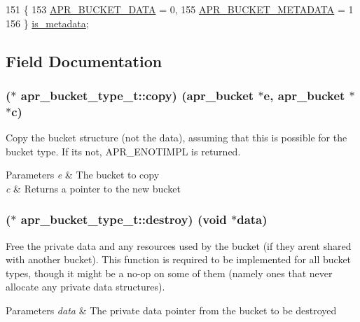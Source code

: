 \begin{DoxyCode}
151          \{
153         \hyperlink{structapr__bucket__type__t_a2c083ffe204e7b680e2de9edbf17a4b1a53d3ef9d6a275fe2b72a91acea7017d5}{APR\_BUCKET\_DATA} = 0,
155         \hyperlink{structapr__bucket__type__t_a2c083ffe204e7b680e2de9edbf17a4b1a9bf38b4eb3ea41c4af230432ac7a5fb1}{APR\_BUCKET\_METADATA} = 1
156     \} \hyperlink{structapr__bucket__type__t_a1a0d40943c081b8ea5f11810b66ae7b9}{is\_metadata};
\end{DoxyCode}


\subsection{Field Documentation}
\subsubsection[{\texorpdfstring{copy}{copy}}]{($\ast$ apr\+\_\+bucket\+\_\+type\+\_\+t\+::copy) ({\bf apr\+\_\+bucket} $\ast${\bf e}, {\bf apr\+\_\+bucket} $\ast$$\ast${\bf c})}\hypertarget{structapr__bucket__type__t_a4e64635ed62e1f371154f934c8a8504f}{}\label{structapr__bucket__type__t_a4e64635ed62e1f371154f934c8a8504f}
Copy the bucket structure (not the data), assuming that this is possible for the bucket type. If it\textquotesingle{}s not, A\+P\+R\+\_\+\+E\+N\+O\+T\+I\+M\+PL is returned. 
\begin{DoxyParams}{Parameters}
{\em e} & The bucket to copy \\
\hline
{\em c} & Returns a pointer to the new bucket \\
\hline
\end{DoxyParams}
\subsubsection[{\texorpdfstring{destroy}{destroy}}]{($\ast$ apr\+\_\+bucket\+\_\+type\+\_\+t\+::destroy) ({\bf void} $\ast${\bf data})}\hypertarget{structapr__bucket__type__t_affe8b803b860b51d6ee86ff1c6d73d12}{}\label{structapr__bucket__type__t_affe8b803b860b51d6ee86ff1c6d73d12}
Free the private data and any resources used by the bucket (if they aren\textquotesingle{}t shared with another bucket). This function is required to be implemented for all bucket types, though it might be a no-\/op on some of them (namely ones that never allocate any private data structures). 
\begin{DoxyParams}{Parameters}
{\em data} & The private data pointer from the bucket to be destroyed \\
\hline
\end{DoxyParams}
